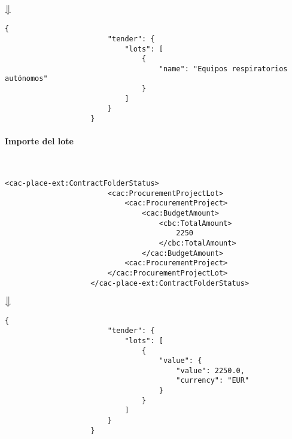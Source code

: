                 \begin{center}
                    $\big\Downarrow$
                \end{center}
                
                \begin{lstlisting}[language=lJSON]
                    {
                        "tender": {
                            "lots": [
                                {
                                    "name": "Equipos respiratorios autónomos"
                                }
                            ]
                        }
                    }
                \end{lstlisting}
                
            \paragraph{Importe del lote} \mbox{}\\
                \begin{lstlisting}[language=lXML]
                    <cac-place-ext:ContractFolderStatus>
                        <cac:ProcurementProjectLot>
                            <cac:ProcurementProject>
                                <cac:BudgetAmount>
                                    <cbc:TotalAmount>
                                        2250
                                    </cbc:TotalAmount>
                                </cac:BudgetAmount>
                            <cac:ProcurementProject>
                        </cac:ProcurementProjectLot>
                    </cac-place-ext:ContractFolderStatus>
                \end{lstlisting}
                
                \begin{center}
                    $\big\Downarrow$
                \end{center}
\newpage
                \begin{lstlisting}[language=lJSON]
                    {
                        "tender": {
                            "lots": [
                                {
                                    "value": {
                                        "value": 2250.0,
                                        "currency": "EUR"
                                    }
                                }
                            ]
                        }
                    }
                \end{lstlisting}
                

